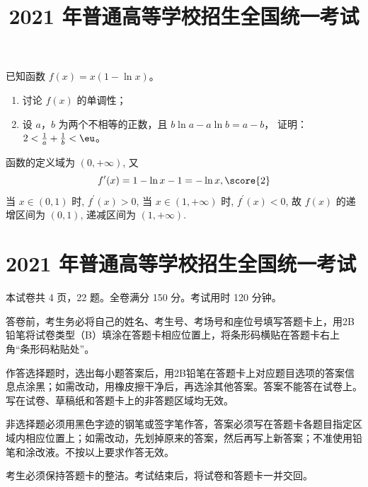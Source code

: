 \documentclass{exam-zh}
\begin{document}
\begin{problem}[points = 12]
  已知函数 $f(x) = x (1 - \ln x)$。
  \begin{enumerate}
    \item 讨论 $f(x)$ 的单调性；
    \item 设 $a$，$b$ 为两个不相等的正数，且 $b \ln a - a \ln b = a - b$，
      证明：$2 < \frac{1}{a} + \frac{1}{b} < \eu$。
  \end{enumerate}
  \begin{solution}
    函数的定义域为 $(0, +\infty)$,
    又 \[f^{\prime}(x) = 1 - \ln x-1 = -\ln x, \score{2}\]
    当 $x \in(0, 1)$ 时, $f^{\prime}(x) > 0$, 当 $x \in(1, +\infty)$ 时, $f^{\prime}(x) < 0$,
    故 $f(x)$ 的递增区间为 $(0,1)$, 递减区间为 $(1, +\infty)$.
  \end{solution}
\end{problem}




\chapter{2021 年普通高等学校招生全国统一考试}

\title{2021 年普通高等学校招生全国统一考试}

\subject{数学（理科）}

\secret

\maketitle

本试卷共 4 页，22 题。全卷满分 150 分。考试用时 120 分钟。


\begin{notice}
  \item 答卷前，考生务必将自己的姓名、考生号、考场号和座位号填写答题卡上，用2B铅笔将试卷类型（B）填涂在答题卡相应位置上，将条形码横贴在答题卡右上角“条形码粘贴处”。
  \item 作答选择题时，选出每小题答案后，用2B铅笔在答题卡上对应题目选项的答案信息点涂黑；如需改动，用橡皮擦干净后，再选涂其他答案。答案不能答在试卷上。
    写在试卷、草稿纸和答题卡上的非答题区域均无效。
  \item 非选择题必须用黑色字迹的钢笔或签字笔作答，答案必须写在答题卡各题目指定区域内相应位置上；如需改动，先划掉原来的答案，然后再写上新答案；不准使用铅笔和涂改液。不按以上要求作答无效。
  \item 考生必须保持答题卡的整洁。考试结束后，将试卷和答题卡一并交回。
\end{notice}
\end{document}

